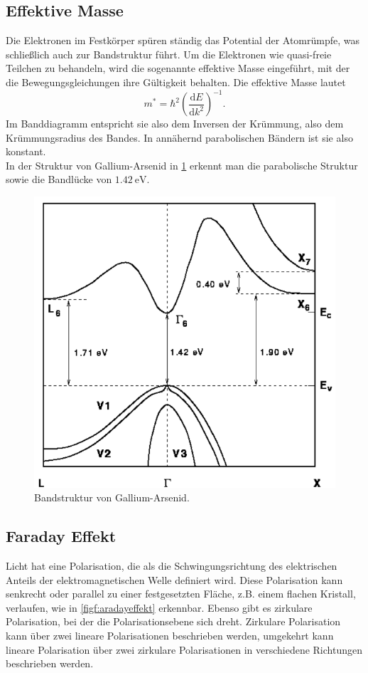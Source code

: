 \subsection{Effektive Masse}
Die Elektronen im Festkörper spüren ständig das Potential der Atomrümpfe, was schließlich auch zur Bandstruktur führt. Um die Elektronen wie quasi-freie Teilchen zu behandeln, wird die sogenannte effektive Masse eingeführt,
mit der die Bewegungsgleichungen ihre Gültigkeit behalten. Die effektive Masse lautet
\begin{equation}
    m^{*} = \hbar^2 \left( \frac{\text{d}E}{\text{d}k^2} \right) ^{-1}.
    \label{eq:effektive_masse}
\end{equation}
Im Banddiagramm entspricht sie also dem Inversen der Krümmung, also dem Krümmungsradius des Bandes. In annähernd parabolischen Bändern ist sie also konstant.\\
In der Struktur von Gallium-Arsenid in \ref{fig:gaas} erkennt man die parabolische Struktur sowie die Bandlücke von $\qty{1.42}{\electronvolt}$.
\begin{figure}[H]
    \centering
    \includegraphics[width=\textwidth]{Bilder/gaas.png}
    \caption{Bandstruktur von Gallium-Arsenid. \cite{gaas}}
    \label{fig:gaas}
\end{figure}


\subsection{Faraday Effekt}
Licht hat eine Polarisation, die als die Schwingungsrichtung des elektrischen Anteils der elektromagnetischen Welle definiert wird. Diese Polarisation kann senkrecht oder parallel zu einer festgesetzten Fläche,
z.B. einem flachen Kristall, verlaufen, wie in \autoref{figf:aradayeffekt}
erkennbar. Ebenso gibt es zirkulare Polarisation, bei der die Polarisationsebene sich dreht. Zirkulare Polarisation kann über zwei lineare Polarisationen beschrieben werden, umgekehrt kann lineare Polarisation über zwei zirkulare
Polarisationen in verschiedene Richtungen beschrieben werden. \\


